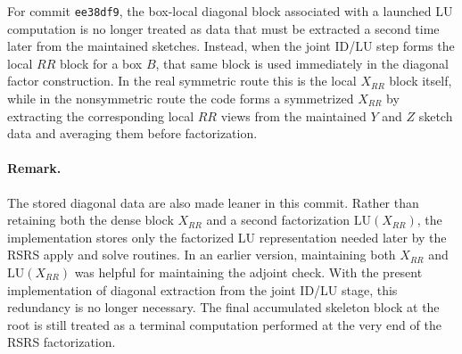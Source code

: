 \documentclass[11pt]{article}
\begin{document}
For commit \texttt{ee38df9}, the box-local diagonal block associated with a
launched LU computation is no longer treated as data that must be extracted a
second time later from the maintained sketches. Instead, when the joint ID/LU
step forms the local $RR$ block for a box $B$, that same block is used
immediately in the diagonal factor construction. In the real symmetric route
this is the local $X_{RR}$ block itself, while in the nonsymmetric route the
code forms a symmetrized $X_{RR}$ by extracting the corresponding local
$RR$ views from the maintained $Y$ and $Z$ sketch data and averaging them
before factorization.

\paragraph{Remark.}
The stored diagonal data are also made leaner in this commit. Rather than
retaining both the dense block $X_{RR}$ and a second factorization
$\mathrm{LU}(X_{RR})$, the implementation stores only the factorized LU
representation needed later by the RSRS apply and solve routines. In an
earlier version, maintaining both $X_{RR}$ and $\mathrm{LU}(X_{RR})$ was
helpful for maintaining the adjoint check. With the present implementation of
diagonal extraction from the joint ID/LU stage, this redundancy is no longer
necessary. The final accumulated skeleton block at the root is still treated
as a terminal computation performed at the very end of the RSRS factorization.

\begin{table}[h]
\centering
\small
{}
\caption{BIEGrid comparison for \texttt{bempp/rsrs} commit \texttt{ee38df9}. The $N=321{,}489$, $k=p=60$ entries are intentionally omitted.}
\label{tab:biegrid_perlevel_constant_ee38df9}
\end{table}
\end{document}
